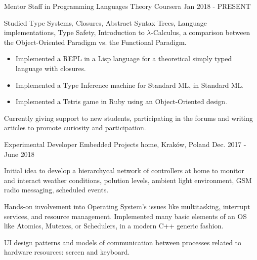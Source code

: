 
\begin{cventries}

\cventry
    {Mentor Staff in \href{https://www.coursera.org/learn/programming-languages}{}}
    {Programming Languages Theory}
    {Coursera}
    {Jan 2018 - PRESENT}
    {
        \begin{cvitems} %
            \item {Studied Type Systems, Closures, Abstract Syntax Trees, Language implementations, Type Safety, Introduction to $\lambda$-Calculus, a comparison between the Object-Oriented Paradigm vs. the Functional Paradigm.}
            \begin{itemize}
                \item {Implemented a REPL in a Lisp language for a theoretical simply typed language with closures.}
                \item {Implemented a Type Inference machine for Standard ML, in Standard ML.}
                \item {Implemented a Tetris game in Ruby using an Object-Oriented design.}
            \end{itemize}
            \item {Currently giving support to new students, participating in the forums and writing articles to promote curiosity and participation.}
        \end{cvitems}
    }

\cventry
    {Experimental Developer}
    {Embedded Projects}
    {home, Kraków, Poland}
    {Dec. 2017 - June 2018}
    {
        \begin{cvitems} %
            \item {Initial idea to develop a hierarchycal network of controllers at home to monitor and interact weather conditions, polution levels, ambient light environment, GSM radio messaging, scheduled events.}
            \item {Hands-on involvement into Operating System's issues like multitasking, interrupt services, and resource management. Implemented many basic elements of an OS like Atomics, Mutexes, or Schedulers, in a modern C++ generic fashion.}
            \item {UI design patterns and models of communication between processes related to hardware resources: screen and keyboard.}
        \end{cvitems}
    }


\end{cventries}
